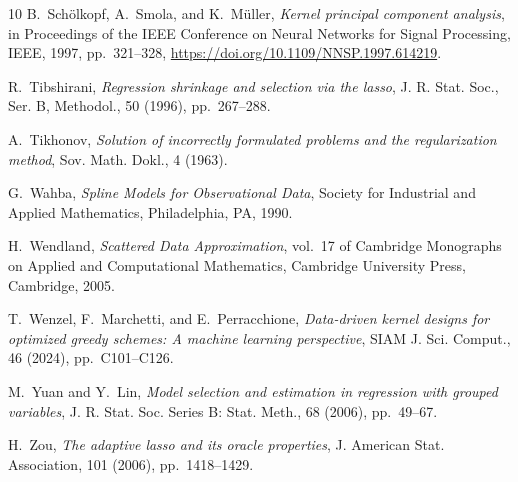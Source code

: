 \documentclass[hyphens,a4paper,11pt]{article}
\begin{document}
\begin{thebibliography}{10}
{\sc B.~Sch{\"o}lkopf, A.~Smola, and K.~M{\"u}ller}, {\em Kernel principal component analysis}, in Proceedings of the IEEE Conference on Neural Networks for Signal Processing, IEEE, 1997, pp.~321--328, \url{https://doi.org/10.1109/NNSP.1997.614219}.

{\sc R.~Tibshirani}, {\em Regression shrinkage and selection via the lasso}, J. R. Stat. Soc., Ser. B, Methodol., 50 (1996), pp.~267--288.

{\sc A.~Tikhonov}, {\em Solution of incorrectly formulated problems and the regularization method}, Sov. Math. Dokl., 4 (1963).

{\sc G.~Wahba}, {\em Spline Models for Observational Data}, Society for Industrial and Applied Mathematics, Philadelphia, PA, 1990.

{\sc H.~Wendland}, {\em Scattered {D}ata {A}pproximation}, vol.~17 of Cambridge Monographs on Applied and Computational Mathematics, Cambridge University Press, Cambridge, 2005.

{\sc T.~Wenzel, F.~Marchetti, and E.~Perracchione}, {\em Data-driven kernel designs for optimized greedy schemes: {A} machine learning perspective}, SIAM J. Sci. Comput., 46 (2024), pp.~C101--C126.

{\sc M.~Yuan and Y.~Lin}, {\em Model selection and estimation in regression with grouped variables}, J. R. Stat. Soc. Series B: Stat. Meth., 68 (2006), pp.~49--67.

{\sc H.~Zou}, {\em The adaptive lasso and its oracle properties}, J. American Stat. Association, 101 (2006), pp.~1418--1429.

\end{thebibliography}
\end{document}
